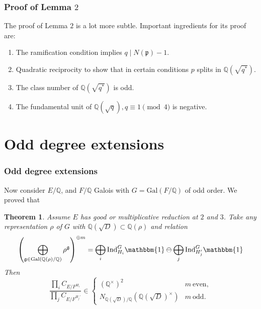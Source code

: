 \documentclass{beamer}
\newcommand{\Gal}{\mathrm{Gal}}
\newcommand{\rk}{\mathrm{rk}}
\newcommand{\Ind}{\mathrm{Ind}}
\newcommand{\QQ}{\mathbb{Q}}
\newcommand{\pp}{\mathfrak{p}}
\newcommand{\bQ}{\mathbb{Q}}
\theoremstyle{plain}
\newtheorem{thm}{Theorem}[section]
\begin{document}
\begin{frame}
    \frametitle{Proof of Lemma $2$}
    The proof of Lemma $2$ is a lot more subtle. Important ingredients for its proof are:
    \begin{enumerate}
        \item The ramification condition implies $q\mid N(\pp)-1$.
        \item Quadratic reciprocity to show that in certain conditions $p$ splits in $\QQ(\sqrt{q^*})$.
        \item The class number of $\QQ(\sqrt{q^*})$ is odd.
        \item The fundamental unit of $\QQ(\sqrt{q}), q\equiv1\pmod{4}$ is negative.
    \end{enumerate}
\end{frame}
\fi


\section*{Odd degree extensions}
\frame{\sectionpage}

\begin{frame}
    \frametitle{Odd degree extensions}
    Now consider $E / \bQ$, and $F / \bQ$ Galois with $G = \Gal(F / \bQ)$ of odd order. \pause
    We proved that
    {\begin{thm}\label{odd-exts}
       Assume $E$ has good or multiplicative reduction at $2$ and $3$. 
       Take any representation $\rho$ of $G$ with $\bQ(\sqrt{D}) \subset \bQ(\rho)$ and relation
       \begin{equation*}\label{odd-exp}
        \left(\bigoplus_{\mathfrak{g}\in\Gal(\QQ(\rho)/\QQ)}\rho^{\mathfrak{g}}\right)^{\oplus m }=\bigoplus_i\Ind_{H_i}^G\mathbbm{1}\ominus\bigoplus_j\Ind_{H_j'}^G\mathbbm{1}
       \end{equation*}
         Then
        \[ \frac{\prod_i C_{E/F^{H_i}}}{\prod_j C_{E/F^{H_j'}}}  \in 
           \begin{cases} 
            (\bQ^{\times})^2 & m \ \text{even},\\
               N_{\bQ(\sqrt{D}) / \bQ}(\bQ(\sqrt{D})^{\times}) & m \ \text{odd}.
           \end{cases} \] 
       \end{thm}}
\end{frame}
\end{document}
